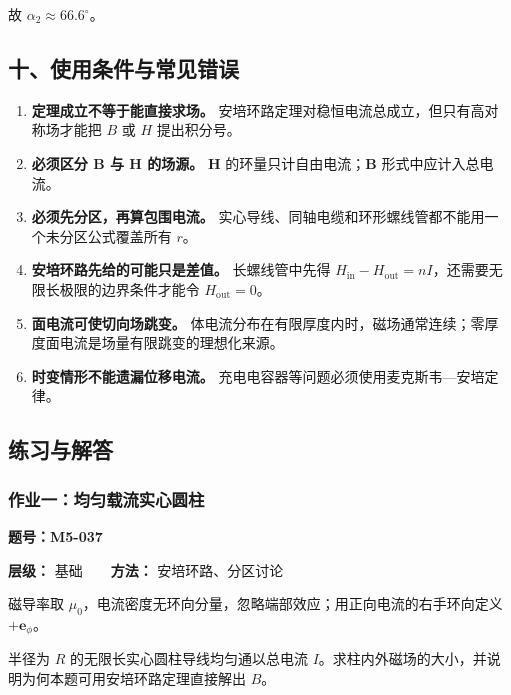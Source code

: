 故 \(\alpha_2\approx66.6^{\circ}\)。

\subsection{十、使用条件与常见错误}\label{m5:ux5341ux4f7fux7528ux6761ux4ef6ux4e0eux5e38ux89c1ux9519ux8bef}

\begin{enumerate}
\def\labelenumi{\arabic{enumi}.}
\tightlist
\item
  \textbf{定理成立不等于能直接求场。}
  安培环路定理对稳恒电流总成立，但只有高对称场才能把 \(B\) 或 \(H\)
  提出积分号。
\item
  \textbf{必须区分 \(\mathbf B\) 与 \(\mathbf H\) 的场源。}
  \(\mathbf H\) 的环量只计自由电流；\(\mathbf B\) 形式中应计入总电流。
\item
  \textbf{必须先分区，再算包围电流。}
  实心导线、同轴电缆和环形螺线管都不能用一个未分区公式覆盖所有 \(r\)。
\item
  \textbf{安培环路先给的可能只是差值。} 长螺线管中先得
  \(H_{\mathrm{in}}-H_{\mathrm{out}}=nI\)，还需要无限长极限的边界条件才能令
  \(H_{\mathrm{out}}=0\)。
\item
  \textbf{面电流可使切向场跳变。}
  体电流分布在有限厚度内时，磁场通常连续；零厚度面电流是场量有限跳变的理想化来源。
\item
  \textbf{时变情形不能遗漏位移电流。}
  充电电容器等问题必须使用麦克斯韦---安培定律。
\end{enumerate}

\subsection{练习与解答}\label{m5:ux7ec3ux4e60ux4e0eux89e3ux7b54-1}

\par{}
\noindent\begin{minipage}{\linewidth}

\subsubsection{作业一：均匀载流实心圆柱}\label{m5:ux4f5cux4e1aux4e00ux5747ux5300ux8f7dux6d41ux5b9eux5fc3ux5706ux67f1}

\textbf{题号：M5-037}

\textbf{层级：} 基础　　\textbf{方法：} 安培环路、分区讨论

磁导率取
\(\mu_0\)，电流密度无环向分量，忽略端部效应；用正向电流的右手环向定义
\(+\mathbf e_{\phi}\)。

半径为 \(R\) 的无限长实心圆柱导线均匀通以总电流
\(I\)。求柱内外磁场的大小，并说明为何本题可用安培环路定理直接解出
\(B\)。

\end{minipage}\par

